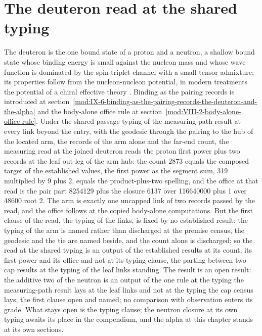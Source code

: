 \section{The deuteron read at the shared typing}\label{mod:IX-6-D539124-w-kshd}
The deuteron is the one bound state of a proton and a neutron, a shallow bound state whose binding energy is small against the nucleon mass and whose wave function is dominated by the spin-triplet channel with a small tensor admixture; its properties follow from the nucleon-nucleon potential, in modern treatments the potential of a chiral effective theory \cite{Bethe1935,Weinberg1991}. Binding as the pairing records is introduced at section~\ref{mod:IX-6-binding-as-the-pairing-records-the-deuteron-and-the-alpha} and the body-alone office rule at section~\ref{mod:VIII-2-body-alone-office-rule}.
Under the shared passage typing of the measuring-path result at every link beyond the entry, with the geodesic through the pairing to the hub of the located arm, the records of the arm alone and the far-end count, the measuring read at the joined deuteron reads the proton first power plus two records at the leaf out-leg of the arm hub: the count 2873 equals the composed target of the established values, the first power as the segment sum, 319 multiplied by 9 plus 2, equals the product-plus-two spelling, and the office at that read is the pair part 8254129 plus the closure 6137 over 116640000 plus 1 over 48600 root 2.
The arm is exactly one uncapped link of two records passed by the read, and the office follows at the copied body-alone computations. But the first clause of the read, the typing of the links, is fixed by no established result: the typing of the arm is named rather than discharged at the premise census, the geodesic and the tie are named beside, and the count alone is discharged; so the read at the shared typing is an output of the established results at its count, its first power and its office and not at its typing clause, the parting between two cap results at the typing of the leaf links standing.
The result is an open result: the additive two of the neutron is an output of the one rule at the typing the measuring-path result lays at the leaf links and not at the typing the cap census lays, the first clause open and named; no comparison with observation enters its grade.
What stays open is the typing clause; the neutron closure at its own typing awaits its place in the compendium, and the alpha at this chapter stands at its own sections.
\par\medskip{}\label{narr:close:9-6}\par
